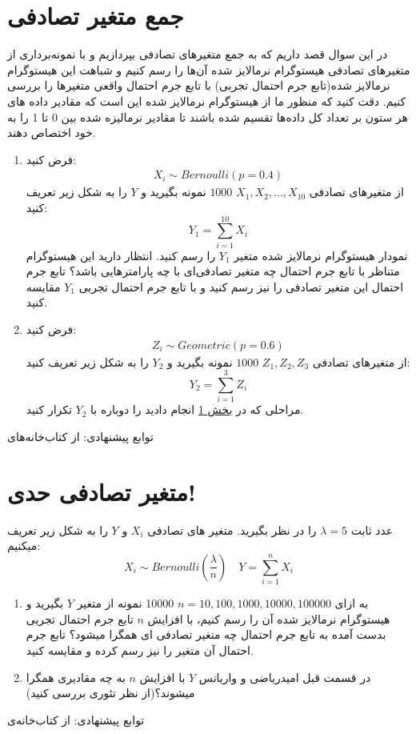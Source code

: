 \documentclass[a4paper]{article}
\begin{document}
\section{‌جمع متغیر تصادفی}
در این سوال قصد داریم که به جمع متغیرهای تصادفی بپردازیم و با نمونه‌برداری از متغیرهای تصادفی هیستوگرام نرمالایز ‌شده آن‌ها را رسم کنیم و شباهت این هیستوگرام نرمالایز شده(تابع جرم احتمال تجربی) با تابع جرم احتمال واقعی متغیرها را بررسی کنیم. دقت کنید که منظور ما از هیستوگرام نرمالایز شده این است که مقادیر داده های هر ستون بر تعداد کل داده‌ها تقسیم شده باشند تا مقادیر نرمالیزه شده بین 0 تا 1 را به خود اختصاص دهند.
\begin{enumerate}
	\item
	فرض کنید:
\begin{gather*}
 X_i \sim Bernoulli(p = 0.4) 
\end{gather*}
از متغیرهای تصادفی
\;
$ X_1, X_2, ..., X_{10} $
\;
$1000$
نمونه بگیرید و $Y$ را به شکل زیر تعریف کنید:
\begin{equation*} \label{y1}
	Y_1 = \sum_{i=1}^{10} X_i
\end{equation*}
نمودار هیستوگرام نرمالایز شده متغیر $Y_1$ را رسم کنید. انتظار دارید این هیستوگرام متناظر با تابع جرم احتمال چه متغیر تصادفی‌ای با چه پارامترهایی باشد؟ تابع جرم احتمال این متغیر تصادفی را نیز رسم کنید و با تابع جرم احتمال تجربی $Y_1$ مقایسه کنید.
	\item
	فرض کنید:
\begin{gather*}
	Z_i \sim Geometric(p = 0.6) 
\end{gather*}
از متغیرهای تصادفی
\;
$ Z_1, Z_2, Z_3 $
\;
$1000$
نمونه بگیرید و $Y_2$ را به شکل زیر تعریف کنید:
\begin{equation*}
	Y_2 = \sum_{i=1}^{3} Z_i
\end{equation*}
مراحلی که در 
\hyperref[y1]{بخش 1}
 انجام دادید را دوباره با $Y_2$ تکرار کنید.
\\
\end{enumerate}

توابع پیشنهادی:
از کتاب‌خانه‌های
\section{متغیر تصادفی حدی!}
عدد ثابت
$ \lambda = 5 $
را در نظر بگیرید. متغیر های تصادفی $X_i$ و $Y$ را به شکل زیر تعریف میکنیم:
\begin{equation*}
	X_i \sim Bernoulli(\frac{\lambda}{n}) \quad Y = \sum_{i=1}^{n} X_i
\end{equation*}
\begin{enumerate}
	\item
	
	به ازای
	$ n = 10, 100, 1000, 10000, 100000 $
	10000 نمونه از متغیر
	$Y$
	بگیرید و هیستوگرام نرمالایز شده آن را رسم کنیم، با افزایش $n$ تابع جرم احتمال تجربی بدست آمده به تابع جرم احتمال چه متغیر تصادفی ای همگرا میشود؟ تابع جرم احتمال آن متغیر را نیز رسم کرده و مقایسه کنید.
	\item
	در قسمت قبل امیدریاضی و واریانس $Y$ با افزایش $n$ به چه مقادیری همگرا میشوند؟(از نظر تئوری بررسی کنید)
	\\
\end{enumerate}
توابع پیشنهادی:
از کتاب‌خانه‌ی 
\end{document}
